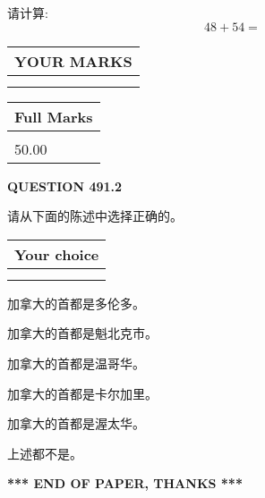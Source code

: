 \documentclass{ctexart}
\begin{document}
  
 
请计算:
\begin{equation}
48 +  %
54 = \nonumber
\end{equation}
 

 

 
  
\vspace{0.2in}
  
\noindent\begin{tabular}{|l|}
\hline
 YOUR MARKS  \\
\hline
 \\ 
 \\ 
\hline
\end{tabular}
\hspace{0.05in} \begin{tabular}{|l|}
\hline
 Full Marks  \\
\hline
 \\ 
50.00 \\
\hline
\end{tabular}
{\textbf{\Large{QUESTION
491.2 
}}}
  
  
请从下面的陈述中选择正确的。
  
  
\noindent\hspace{3.0in} \begin{tabular}{|l|}
\hline
Your choice \\
\hline
 \\ 
 \\ 
\hline
\end{tabular}
  
  
 
 
加拿大的首都是多伦多。
 
 
加拿大的首都是魁北克市。
 
 
加拿大的首都是温哥华。
 
 
加拿大的首都是卡尔加里。
 
 
加拿大的首都是渥太华。
 
 
 上述都不是。
 
 
   
   
 \vspace{0.2in}
 
   
   
   
   
\vspace{1.0in} 
{\textbf{\large{ *** END OF PAPER, THANKS *** }}} 
   
\end{document}
